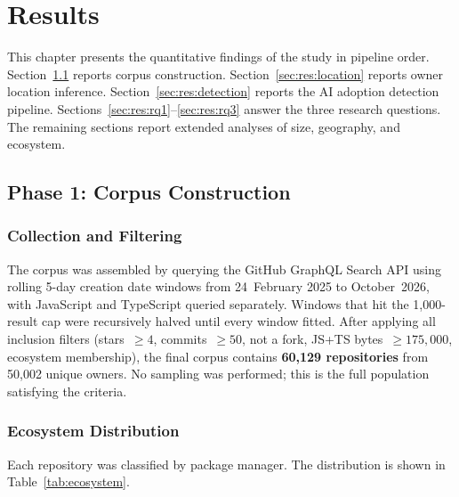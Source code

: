 
\chapter{Results}
\label{chap:results}

This chapter presents the quantitative findings of the study in pipeline order. Section~\ref{sec:res:corpus} reports corpus construction. Section~\ref{sec:res:location} reports owner location inference. Section~\ref{sec:res:detection} reports the AI adoption detection pipeline. Sections~\ref{sec:res:rq1}--\ref{sec:res:rq3} answer the three research questions. The remaining sections report extended analyses of size, geography, and ecosystem.

\section{Phase 1: Corpus Construction}
\label{sec:res:corpus}

\subsection{Collection and Filtering}

The corpus was assembled by querying the GitHub GraphQL Search API using rolling 5-day creation date windows from 24~February 2025 to October~2026, with JavaScript and TypeScript queried separately. Windows that hit the 1,000-result cap were recursively halved until every window fitted. After applying all inclusion filters (stars~$\geq 4$, commits~$\geq 50$, not a fork, JS+TS bytes~$\geq 175{,}000$, ecosystem membership), the final corpus contains \textbf{60,129 repositories} from 50,002 unique owners. No sampling was performed; this is the full population satisfying the criteria.

\subsection{Ecosystem Distribution}

Each repository was classified by package manager. The distribution is shown in Table~\ref{tab:ecosystem}.

